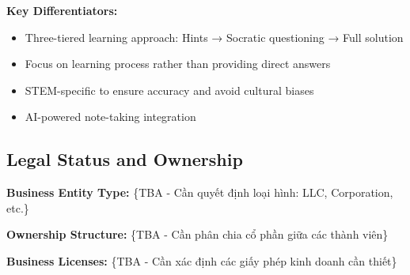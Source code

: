 \textbf{Key Differentiators:}
\begin{itemize}
    \item Three-tiered learning approach: Hints → Socratic questioning → Full solution
    \item Focus on learning process rather than providing direct answers
    \item STEM-specific to ensure accuracy and avoid cultural biases
    \item AI-powered note-taking integration
\end{itemize}

\subsection{Legal Status and Ownership}
\textbf{Business Entity Type:} \{TBA - Cần quyết định loại hình: LLC, Corporation, etc.\}

\textbf{Ownership Structure:} \{TBA - Cần phân chia cổ phần giữa các thành viên\}

\textbf{Business Licenses:} \{TBA - Cần xác định các giấy phép kinh doanh cần thiết\}